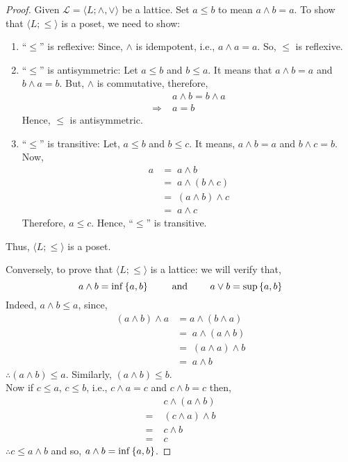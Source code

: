 \documentclass[../main-sheet.tex]{subfiles}
\begin{document}
\begin{proof}
    Given \(\mathcal{L}=\langle L; \wedge,\vee\rangle\) be a lattice.
    Set \(a\leq b\) to mean \(a\wedge b=a\).
    To show that \(\langle L; \leq\rangle\) is a poset, we need to show:
    \begin{enumerate}[label=(\roman*)]
        \item ``\(\leq\)'' is reflexive: Since, \(\wedge\) is idempotent, i.e., \(a\wedge a=a\).
        So, \(\leq\) is reflexive.
        \item ``\(\leq\)'' is antisymmetric: Let \(a\leq b\) and \(b\leq a\).
        It means that \(a\wedge b=a\) and \(b\wedge a=b\).
        But, \(\wedge\) is commutative, therefore,
        \begin{align*}
            & a\wedge b=b\wedge a\\
            \Rightarrow\;& a=b
        \end{align*}
        Hence, \(\leq\) is antisymmetric.
        \item ``\(\leq\)'' is transitive: Let, \(a\leq b\) and \(b\leq c\).
        It means, \(a\wedge b=a\) and \(b\wedge c=b\).\\
        Now, 
        \begin{align*}
            a&=\;a\wedge b\\
            &=\;a\wedge (b\wedge c)\\
            &=\;(a\wedge b)\wedge c\\
            &=\;a\wedge c
        \end{align*}
        Therefore, \(a\leq c\). Hence, ``\(\leq\)'' is transitive.
    \end{enumerate}


    Thus, \(\langle L;\leq  \rangle\) is a poset.
    
    Conversely, to prove that \(\langle L;\leq  \rangle\) is a lattice: we will verify that,
    \[
        a\wedge b=\inf \left\{a,b\right\}\qquad\text{ and }\qquad a\vee b=\sup \left\{a,b\right\}
    \]
    Indeed, \(a\wedge b\leq a\), since,
    \begin{align*}
        (a\wedge b)\wedge a&=a\wedge (b\wedge a)\\
        &=\;a\wedge (a\wedge b)\\
        &=\;(a\wedge a)\wedge b\\
        &=\;a\wedge b
    \end{align*}
    \(\therefore (a\wedge b)\leq a\). Similarly, \((a\wedge b)\leq b\).\\
    Now if \(c\leq a\), \(c\leq b\), i.e., \(c\wedge a=c\) and \(c\wedge b=c\) then,
    \begin{align*}
        &c\wedge (a\wedge b)\\
        =\;& (c\wedge a)\wedge b\\
        =\;& c\wedge b\\
        =\;& c
    \end{align*}
    \(\therefore c\leq a\wedge b\) and so, \(a\wedge b=\inf\left\{a,b\right\}\).
    

\end{proof}
\end{document}
